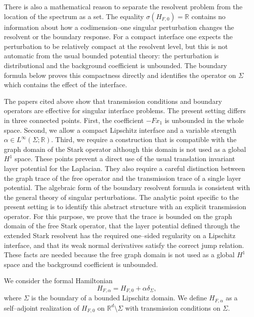 \documentclass[a4paper,11pt]{article}
\numberwithin{equation}{section}
\theoremstyle{remark}
\theoremstyle{definition}
\theoremstyle{remark}
\begin{document}
There is also a mathematical reason to separate the resolvent problem from the
location of the spectrum as a set.
The equality $\sigma(H_{F,0})=\mathbb R$ contains no information about how a
codimension--one singular perturbation changes the resolvent or the boundary
response.
For a compact interface one expects the perturbation to be relatively compact
at the resolvent level, but this is not automatic from the usual bounded
potential theory: the perturbation is distributional and the background
coefficient is unbounded.
The boundary formula below proves this compactness directly and identifies the
operator on $\Sigma$ which contains the effect of the interface.

The papers cited above show that transmission conditions and boundary operators are effective for singular interface problems.
The present setting differs in three connected points.
First, the coefficient $-Fx_1$ is unbounded in the whole space.
Second, we allow a compact Lipschitz interface and a variable strength $\alpha\in L^\infty(\Sigma;\mathbb R)$.
Third, we require a construction that is compatible with the graph domain of the Stark operator although this domain is not used as a global $H^1$ space.
These points prevent a direct use of the usual translation invariant layer potential for the Laplacian.
They also require a careful distinction between the graph trace of the free operator and the transmission trace of a single layer potential.
The algebraic form of the boundary resolvent formula is consistent with the
general theory of singular perturbations.
The analytic point specific to the present setting is to identify this
abstract structure with an explicit transmission operator.
For this purpose, we prove that the trace is bounded on the graph domain of
the free Stark operator, that the layer potential defined through the extended
Stark resolvent has the required one--sided regularity on a Lipschitz
interface, and that its weak normal derivatives satisfy the correct jump
relation.
These facts are needed because the free graph domain is not used as a global
$H^1$ space and the background coefficient is unbounded.

We consider the formal Hamiltonian
$$
H_{F,\alpha}=H_{F,0}+\alpha\delta_\Sigma,
$$
where $\Sigma$ is the boundary of a bounded Lipschitz domain.
We define $H_{F,\alpha}$ as a self--adjoint realization of $H_{F,0}$ on $\mathbb R^d\setminus\Sigma$ with transmission conditions on $\Sigma$.
\end{document}
